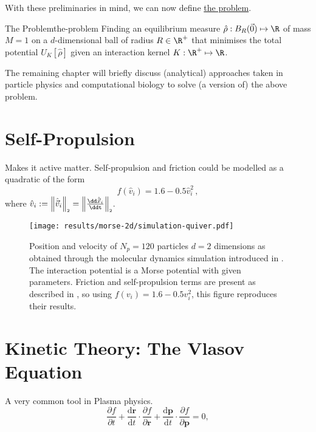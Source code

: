 With these preliminaries in mind, we can now define \href{def:the-problem}{the problem}.

\begin{definition}[colframe=gray, colbacktitle=gray!30]{The Problem}{the-problem}
  Finding an equilibrium measure $\hat{\rho}: B_R(\vec{0}) \mapsto \R$ of mass $M = 1$ on a $d$-dimensional ball of radius $R \in \R^+$ that minimises the total potential $U_K[\hat{\rho}]$ given an interaction kernel $K: \R^+ \mapsto \R$.
\end{definition}

The remaining chapter will briefly discuss (analytical) approaches taken in particle physics and computational biology to solve (a version of) the above problem.

\section{Self-Propulsion}
Makes it active matter.
Self-propulsion and friction could be modelled as a quadratic of the form
$$f(\hat{v}_i) = 1.6 - 0.5 \hat{v}_i^2\,,$$
where $\hat{v}_i := \norm{\hatvec{v}_i} = \norm{\frac{\dd\hatvec{x}_i}{\ddt}}$.

\hierKoennteIhreWerbungStehen

\begin{figure}[H]
  \centering
  \label{fig:simulation-quiver-illustration}
  \texttt{[image: results/morse-2d/simulation-quiver.pdf]}
  \caption[Quiver plot of 120 particles in 2D interacting through the Morse potential]{Position and velocity of $N_p = 120$ particles $d = 2$ dimensions as obtained through the molecular dynamics simulation introduced in . The interaction potential is a Morse potential with given parameters. Friction and self-propulsion terms are present as described in \cite{2006-self-propelled}, so using $f(v_i) = 1.6 - 0.5 v_i^2$, this figure reproduces their results.}
\end{figure}


\section{Kinetic Theory: The Vlasov Equation}
A very common tool in Plasma physics.
$$\frac{\partial f}{\partial t}+{\frac {\mathrm {d} \mathbf {r} }{\mathrm {d} t}}\cdot {\frac {\partial f}{\partial \mathbf {r} }}+{\frac {\mathrm {d} \mathbf {p} }{\mathrm {d} t}}\cdot {\frac {\partial f}{\partial \mathbf {p} }}=0,$$

